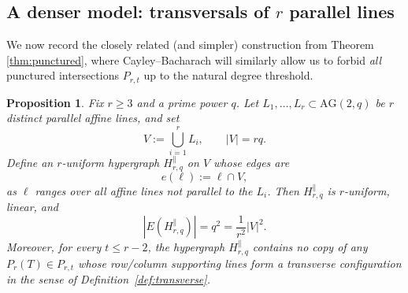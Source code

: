 \documentclass[11pt]{article}
\newtheorem{proposition}[theorem]{Proposition}
\theoremstyle{definition}
\theoremstyle{remark}
\newcommand{\AG}{\mathrm{AG}}
\begin{document}
\subsection{A denser model: transversals of $r$ parallel lines}

We now record the closely related (and simpler) construction from Theorem \ref{thm:punctured}, where Cayley--Bacharach will similarly allow us to forbid \emph{all} punctured intersections $P_{r,t}$ up to the natural degree threshold.

\begin{proposition}\label{prop:Prt-free}
Fix $r\ge 3$ and a prime power $q$.
Let $L_1,\dots,L_r\subset \AG(2,q)$ be $r$ distinct parallel affine lines, and set
\[
V:=\bigcup_{i=1}^r L_i,
\qquad |V|=rq.
\]
Define an $r$-uniform hypergraph $H^{\parallel}_{r,q}$ on $V$ whose edges are
\[
e(\ell):=\ell\cap V,
\]
as $\ell$ ranges over all affine lines not parallel to the $L_i$.
Then $H^{\parallel}_{r,q}$ is $r$-uniform, linear, and
\[
|E(H^{\parallel}_{r,q})| = q^2 = \frac{1}{r^2}|V|^2.
\]
Moreover, for every $t\le r-2$, the hypergraph $H^{\parallel}_{r,q}$ contains no copy of any $P_r(T)\in P_{r,t}$
whose row/column supporting lines form a transverse configuration in the sense of Definition~\ref{def:transverse}.
\end{proposition}
\end{document}
